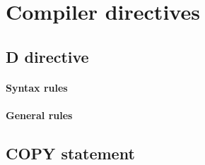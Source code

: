 \chapter{Compiler directives}

\section{D directive}

\begin{syntax}
\end{syntax}

\subsubsection{Syntax rules}

\subsubsection{General rules}

\section{COPY statement}

